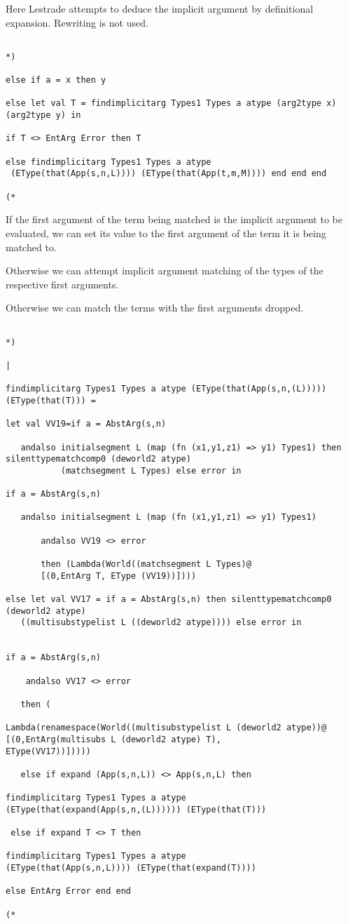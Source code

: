 \documentclass{article}
\begin{document}
Here Lestrade attempts to deduce the implicit argument by definitional expansion.  Rewriting is not used.

\begin{verbatim}

*)

else if a = x then y

else let val T = findimplicitarg Types1 Types a atype (arg2type x) (arg2type y) in

if T <> EntArg Error then T

else findimplicitarg Types1 Types a atype
 (EType(that(App(s,n,L)))) (EType(that(App(t,m,M)))) end end end

(*

\end{verbatim}

If the first argument of the term being matched is the implicit argument to be evaluated, we can set its value
to the first argument of the term it is being matched to.

Otherwise we can attempt implicit argument matching of the types of the respective
first arguments.

Otherwise we can match the terms with the first arguments dropped.

\begin{verbatim}

*)

|

findimplicitarg Types1 Types a atype (EType(that(App(s,n,(L))))) (EType(that(T))) =

let val VV19=if a = AbstArg(s,n)

   andalso initialsegment L (map (fn (x1,y1,z1) => y1) Types1) then silenttypematchcomp0 (deworld2 atype) 
           (matchsegment L Types) else error in

if a = AbstArg(s,n)

   andalso initialsegment L (map (fn (x1,y1,z1) => y1) Types1)

       andalso VV19 <> error

       then (Lambda(World((matchsegment L Types)@
       [(0,EntArg T, EType (VV19))])))

else let val VV17 = if a = AbstArg(s,n) then silenttypematchcomp0 (deworld2 atype)
   ((multisubstypelist L ((deworld2 atype)))) else error in


if a = AbstArg(s,n)

    andalso VV17 <> error 

   then (

Lambda(renamespace(World((multisubstypelist L (deworld2 atype))@
[(0,EntArg(multisubs L (deworld2 atype) T),
EType(VV17))]))))

   else if expand (App(s,n,L)) <> App(s,n,L) then

findimplicitarg Types1 Types a atype 
(EType(that(expand(App(s,n,(L)))))) (EType(that(T))) 

 else if expand T <> T then

findimplicitarg Types1 Types a atype 
(EType(that(App(s,n,L)))) (EType(that(expand(T))))

else EntArg Error end end

(*

\end{verbatim}
\end{document}
